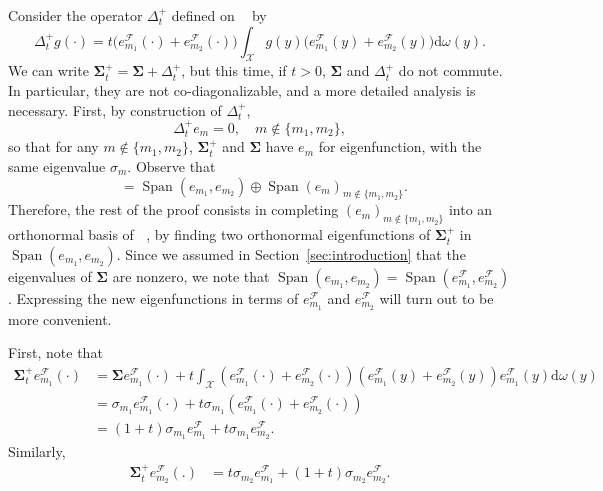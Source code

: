 \documentclass[twoside,11pt]{book}
\DeclareMathOperator{\Span}{\mathrm{Span}}
\DeclareMathOperator{\F}{\mathcal{F}}
\DeclareMathOperator{\X}{\mathcal{X}}
\DeclareMathOperator{\Ltwo}{\mathbb{L}_{2}(\mathrm{d} \omega)}
\begin{document}
Consider the operator $\Delta_{t}^{+}$ defined on $\Ltwo$ by
\begin{equation}
\Delta_{t}^{+}g(\cdot) = t \bigg(e_{m_{1}}^{\F}(\cdot)+e_{m_{2}}^{\F}(\cdot) \bigg) \int_{\X} g(y) \bigg(e_{m_{1}}^{\F}(y)+e_{m_{2}}^{\F}(y) \bigg) \mathrm{d}\omega(y).
\end{equation}
We can write $\bm{\Sigma}_{t}^{+} = \bm{\Sigma} + \Delta_{t}^{+}$, but this time, if $t>0$, $\bm{\Sigma}$ and $\Delta_{t}^{+}$ do not commute. In particular, they are not co-diagonalizable, and a more detailed analysis is necessary. First, by construction of $\Delta_{t}^{+}$,
$$
\Delta_{t}^{+} e_m = 0, \quad m\notin\{m_1,m_2\},
$$
so that for any $m\notin\{m_1,m_2\}$, $\bm{\Sigma}_{t}^{+}$ and $\bm{\Sigma}$ have $e_m$ for eigenfunction, with the same eigenvalue $\sigma_m$. Observe that
\begin{equation}
\Ltwo = \Span (e_{m_1},e_{m_2}) \oplus \Span (e_{m})_{m \notin \{m_1,m_2\}}.
\end{equation}
Therefore, the rest of the proof consists in completing $(e_m)_{m\notin\{m_1,m_2\}}$ into an orthonormal basis of $\Ltwo$, by finding two orthonormal eigenfunctions of $\bm{\Sigma}_{t}^{+}$ in $\Span (e_{m_{1}},e_{m_{2}})$.
Since we assumed in Section~\ref{sec:introduction} that the eigenvalues of $\bm{\Sigma}$ are nonzero, we note that $\Span (e_{m_{1}},e_{m_{2}}) = \Span (e_{m_{1}}^{\F},e_{m_{2}}^{\F})$. Expressing the new eigenfunctions in terms of $e_{m_{1}}^{\F}$ and $e_{m_{2}}^{\F}$ will turn out to be more convenient.

First, note that 
\begin{align}
\bm{\Sigma}_{t}^{+}e_{m_{1}}^{\mathcal{F}}(\cdot) & = \bm{\Sigma} e_{m_{1}}^{\mathcal{F}}(\cdot) + t \int_{\mathcal{X}} \left(e_{m_{1}}^{\mathcal{F}}(\cdot) + e_{m_{2}}^{\mathcal{F}}(\cdot) \right)\left( e_{m_{1}}^{\mathcal{F}}(y) + e_{m_{2}}^{\mathcal{F}}(y) \right) e_{m_{1}}^{\mathcal{F}}(y) \mathrm{d}\omega(y) \\
& = \sigma_{m_{1}} e_{m_{1}}^{\mathcal{F}}(\cdot) + t \sigma_{m_{1}} \left(e_{m_{1}}^{\mathcal{F}}(\cdot) + e_{m_{2}}^{\mathcal{F}}(\cdot) \right)\\
& = (1+t) \sigma_{m_{1}}e_{m_{1}}^{\mathcal{F}} + t \sigma_{m_{1}} e_{m_{2}}^{\mathcal{F}}.\label{eq:sigma_t_plus_action}
\end{align}
Similarly,
\begin{align}
\bm{\Sigma}_{t}^{+}e_{m_{2}}^{\mathcal{F}}(.) & = t \sigma_{m_{2}} e_{m_{1}}^{\mathcal{F}} + (1+t) \sigma_{m_{2}}e_{m_{2}}^{\mathcal{F}}.\label{eq:sigma_t_plus_action_2}
\end{align}
\end{document}
